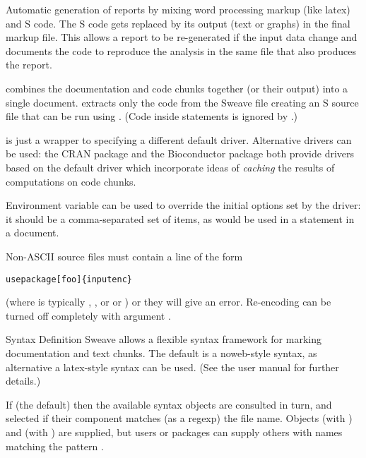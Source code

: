 \begin{Details}\relax
Automatic generation of reports by mixing word processing markup (like
latex) and S code.  The S code gets replaced by its output (text or
graphs) in the final markup file.  This allows a report to be re-generated
if the input data change and documents the code to reproduce the
analysis in the same file that also produces the report.

 combines the documentation and code chunks together (or
their output) into a single document.   extracts only
the code from the Sweave file creating an S source file that can be
run using .  (Code inside 
statements is ignored by .)

 is just a wrapper to  specifying a
different default driver.  Alternative drivers can be used: the CRAN
package  and the Bioconductor package 
both provide drivers based on the default driver
 which incorporate ideas of \emph{caching}
the results of computations on code chunks.

Environment variable  can be used to override the
initial options set by the driver: it should be a comma-separated set
of  items, as would be used in a 
statement in a document.

Non-ASCII source files must contain a line of the form
\begin{alltt}\bsl{}usepackage[foo]\{inputenc\}\end{alltt}

(where  is typically , ,  or
 or ) or they will give an error.
Re-encoding can be turned off completely with argument .
\end{Details}
%
\begin{Section}{Syntax Definition}
Sweave allows a flexible syntax framework for marking
documentation and text chunks. The default is a noweb-style syntax, as
alternative a latex-style syntax can be used.  (See the user manual for
further details.)

If  (the default) then the available syntax
objects are consulted in turn, and selected if their 
component matches (as a regexp) the file name.  Objects
 (with ) and
 (with ) are
supplied, but users or packages can supply others with names matching
the pattern .
\end{Section}
